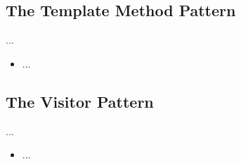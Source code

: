 \documentclass[11pt]{article}
\begin{document}
    \subsection{The Template Method Pattern}
    ...
    \begin{itemize}
        \item ...
    \end{itemize}

    \subsection{The Visitor Pattern}
    ...
    \begin{itemize}
        \item ...
    \end{itemize}
\end{document}
